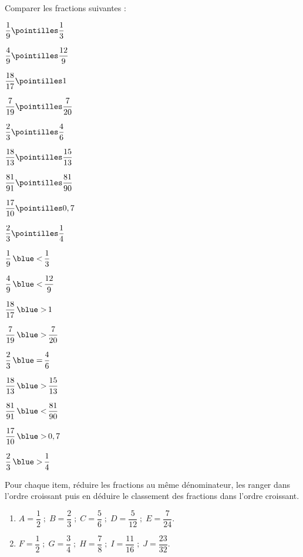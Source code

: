 \begin{colonne*exercice}
\smallskip


\begin{exercice} %
   Comparer les fractions suivantes : \medskip
   \begin{colenumerate}{3}
      \item $\dfrac{1}{9} \pointilles \dfrac{1}{3}$ \bigskip
      \item $\dfrac{4}{9} \pointilles \dfrac{12}{9}$ \bigskip
      \item $\dfrac{18}{17} \pointilles 1$ \bigskip
      \item $\dfrac{7}{19} \pointilles \dfrac{7}{20}$
      \item $\dfrac{2}{3} \pointilles \dfrac{4}{6}$
      \item $\dfrac{18}{13} \pointilles \dfrac{15}{13}$
      \item $\dfrac{81}{91} \pointilles \dfrac{81}{90}$
      \item $\dfrac{17}{10} \pointilles 0,7$
      \item $\dfrac{2}{3} \pointilles \dfrac{1}{4}$
   \end{colenumerate}
\end{exercice}

\begin{corrige}
   \begin{colenumerate}{3}
      \item $\dfrac{1}{9} \, {\blue <} \, \dfrac{1}{3}$ \bigskip
      \item $\dfrac{4}{9} \, {\blue <} \,\dfrac{12}{9}$ \bigskip
      \item $\dfrac{18}{17} \, {\blue >} \,1$
      \item $\dfrac{7}{19} \, {\blue >} \,\dfrac{7}{20}$
      \item $\dfrac{2}{3} \, {\blue =} \,\dfrac{4}{6}$
      \item $\dfrac{18}{13} \, {\blue >} \,\dfrac{15}{13}$
      \item $\dfrac{81}{91} \, {\blue <} \,\dfrac{81}{90}$
      \item $\dfrac{17}{10} \, {\blue >} \,0,7$
      \item $\dfrac{2}{3} \, {\blue >} \,\dfrac{1}{4}$
   \end{colenumerate}
\end{corrige}

\smallskip


\begin{exercice} %
   Pour chaque item, réduire les fractions au même dénominateur, les ranger dans l'ordre croissant puis en déduire le classement des fractions dans l'ordre croissant. \\ [-2mm]
   \begin{enumerate}
      \item $A =\dfrac12 \; ; \; B =\dfrac23 \; ; \; C =\dfrac56 \; ; \; D = \dfrac5{12} \; ; \; E =\dfrac7{24}$. \medskip
      \item $F =\dfrac12 \; ; \; G =\dfrac34 \; ; \; H =\dfrac78 \; ; \; I = \dfrac{11}{16} \; ; \; J =\dfrac{23}{32}$.
   \end{enumerate}
\end{exercice}


\end{colonne*exercice}
